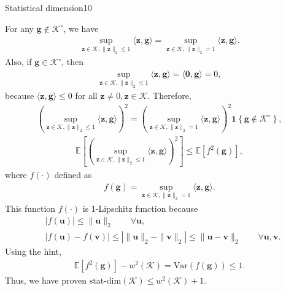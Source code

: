 \documentclass{article}
\begin{document}
\begin{problem}{Statistical dimension}{10}
{ For any $\bm{g}\not\in\mathcal{K}^{\circ}$, we have
 	\begin{align*}
 	\sup_{\bm{z}\in\mathcal{K}, \|\bm{z}\|_2\leq 1} \langle\bm{z},\bm{g}\rangle	=\sup_{\bm{z}\in\mathcal{K}, \|\bm{z}\|_2= 1} \langle\bm{z},\bm{g}\rangle.
 	\end{align*}
Also, if $\bm{g}\in \mathcal{K}^{\circ}$, then 
	\begin{align*}
	\sup_{\bm{z}\in\mathcal{K}, \|\bm{z}\|_2\leq 1} \langle\bm{z},\bm{g}\rangle=\langle \bm{0},\bm{g}\rangle=0,	
	\end{align*}
because $\langle \bm{z},\bm{g}\rangle\leq 0$ for all $\bm{z}\neq 0, \bm{z}\in\mathcal{K}$. 
Therefore,
	\begin{align*}
	\left(\sup_{\bm{z}\in\mathcal{K}, \|\bm{z}\|_2\leq 1} \langle\bm{z},\bm{g}\rangle	\right)^2=\left(\sup_{\bm{z}\in\mathcal{K}, \|\bm{z}\|_2= 1} \langle\bm{z},\bm{g}\rangle\right)^2
	\mathbf{1}\left\{\bm{g}\not\in \mathcal{K}^{\circ}\right\},
	\end{align*}
	\begin{align*}
	\mathbb{E}\left[\left(\sup_{\bm{z}\in\mathcal{K}, \|\bm{z}\|_2\leq 1} \langle\bm{z},\bm{g}\rangle\right)^2\right]\leq \mathbb{E}\left[ f^2(\bm{g})\right],	
	\end{align*}
where $f(\cdot)$ defined as
	\begin{align*}
	f(\bm{g})=\sup_{\bm{z}\in\mathcal{K}, \|\bm{z}\|_2= 1}	 \langle \bm{z},\bm{g}\rangle.
	\end{align*}
This function $f(\cdot)$ is 1-Lipschitz function because 
	\begin{align*}
	&|f(\bm{u})|\leq \|\bm{u}\|_2\quad\quad\forall\bm{u},\\
	&|f(\bm{u})-f(\bm{v})| \leq \left|\|\bm{u}\|_2-\|\bm{v}\|_2\right| \leq \|\bm{u}-\bm{v}\|_2 \quad\quad\forall\bm{u},\bm{v}.
	\end{align*}
Using the hint,
	\begin{align*}
	\mathbb{E}\left[ f^2(\bm{g})\right]-w^2(\mathcal{K})	=\text{Var}(f(\bm{g}))\leq 1.
	\end{align*}
Thus, we have proven $  \text{stat-dim}(\mathcal{K}) \leq w^2(\mathcal{K}) + 1 $.



}

\end{problem}
\end{document}
